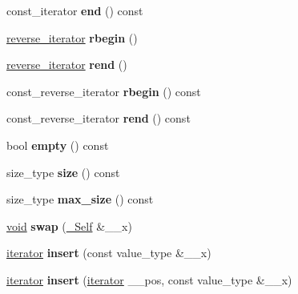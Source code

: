 \begin{DoxyCompactItemize}
const\+\_\+iterator {\bfseries end} () const
\item 
\mbox{\label{classmultiset_a2999ddd28b3ae3b18fa4fcfe2e850c8a}} 
\hyperlink{classreverse__iterator}{reverse\+\_\+iterator} {\bfseries rbegin} ()
\item 
\mbox{\label{classmultiset_ab617ab228beb94ddadc794275bbcb2e3}} 
\hyperlink{classreverse__iterator}{reverse\+\_\+iterator} {\bfseries rend} ()
\item 
\mbox{\label{classmultiset_adda1651e5cfe3138bb634a6a5823a4b2}} 
const\+\_\+reverse\+\_\+iterator {\bfseries rbegin} () const
\item 
\mbox{\label{classmultiset_a118097dbe4f87ef663a33a80bd16402c}} 
const\+\_\+reverse\+\_\+iterator {\bfseries rend} () const
\item 
\mbox{\label{classmultiset_a69cd4472aa28dc71c17d770b0751a2f0}} 
bool {\bfseries empty} () const
\item 
\mbox{\label{classmultiset_a37e028347c03d8a34a63eefc968933fb}} 
size\+\_\+type {\bfseries size} () const
\item 
\mbox{\label{classmultiset_a1c689efb56fdb7510dc2029758e172b3}} 
size\+\_\+type {\bfseries max\+\_\+size} () const
\item 
\mbox{\label{classmultiset_a6b589e66a0db89044deb5309892887fa}} 
\hyperlink{interfacevoid}{void} {\bfseries swap} (\hyperlink{classmultiset}{\+\_\+\+Self} \&\+\_\+\+\_\+x)
\item 
\mbox{\label{classmultiset_a895bba2e82e7b5c23fcf8139f605d7d1}} 
\hyperlink{structiterator}{iterator} {\bfseries insert} (const value\+\_\+type \&\+\_\+\+\_\+x)
\item 
\mbox{\label{classmultiset_a3d6f58d000ab2fa8310dd3fc6f7cd95f}} 
\hyperlink{structiterator}{iterator} {\bfseries insert} (\hyperlink{structiterator}{iterator} \+\_\+\+\_\+pos, const value\+\_\+type \&\+\_\+\+\_\+x)
\item 
\mbox{\label{classmultiset_aae6b99f3e96d1c8d4ac65fce6f127220}} 

\end{DoxyCompactItemize}
